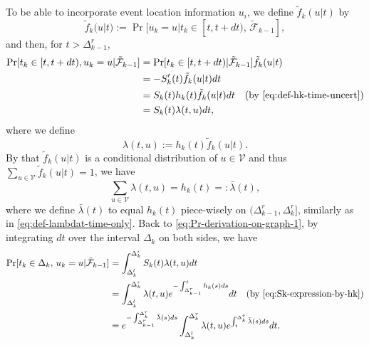 \documentclass[11pt]{article}
\theoremstyle{remark}
\theoremstyle{plain}
\newcommand{\calF}{\mathcal{F}}
\newcommand{\calV}{\mathcal{V}}
\begin{document}
%
To be able to incorporate event location information $u_i$, we define $\tilde{f}_k(u|t)$ by
\begin{equation}\label{eq:def-tilde-fk}
\tilde{f}_k(u|t)  
:= \Pr [ u_k = u| t_k \in [t, t+dt), \, \tilde{\calF}_{k-1} ],
\end{equation}
and then, for $t > \Delta_{k-1}^r$,
\begin{align}
\Pr[ t_k \in [t, t+dt), u_k =u | \tilde{\calF}_{k-1} ]
& = \Pr[ t_k \in [t, t+dt)  | \tilde{\calF}_{k-1} ]\tilde{f}_k(u|t)  \nonumber \\
& = -S_k'(t) \tilde{f}_k(u|t) dt  \nonumber  \\
& = S_k(t) h_k(t) \tilde{f}_k(u|t) dt 
    \quad \text{(by \eqref{eq:def-hk-time-uncert})}\nonumber  \\
& = S_k(t) \lambda( t, u) dt, \label{eq:Pr-derivation-on-graph-1}
\end{align}
where we define 
\begin{equation}\label{eq:def-lambda-tu}
\lambda(t,u) := h_k(t) \tilde{f}_k(u|t).
\end{equation}
By that $\tilde{f}_k(u|t)$ is a conditional distribution of $u \in \calV$ and thus
$\sum_{u \in\calV} \tilde{f}_k(u|t) = 1 $,  we have
\begin{equation}\label{eq:equation-bar-lambda(t)}
\sum_{u \in\calV} \lambda(t,u) = h_k(t) =: \bar{\lambda}(t),
\end{equation}
where we define $\bar{\lambda}(t)$ to equal $h_k(t)$ piece-wisely on $(\Delta_{k-1}^r, \Delta_{k}^r]$, similarly as in 
\eqref{eq:def-lambdat-time-only}.
Back to \eqref{eq:Pr-derivation-on-graph-1},
by integrating $dt$ over the interval $\Delta_k$ on both sides,
we have
\begin{align}
\Pr [ t_k \in \Delta_k, \, u_k = u | \tilde{\calF}_{k-1}]
& = \int_{\Delta_k^l}^{\Delta_k^r} S_k(t) \lambda( t, u) dt  \nonumber  \\
& = \int_{\Delta_k^l}^{\Delta_k^r} \lambda( t, u) e^{ - \int_{\Delta_{k-1}^r}^t h_k(s) ds} dt  \quad \text{(by \eqref{eq:Sk-expression-by-hk})}
 	 \label{eq:Pr-tk-cont-time-uncert-on-graph-form-a}\\
& = e^{ - \int_{\Delta_{k-1}^r}^{\Delta_{k}^r}  \bar{\lambda} (s) ds}  
	\int_{\Delta_k^l}^{\Delta_k^r} \lambda( t, u) e^{ \int_t^{\Delta_{k}^r}  \bar{\lambda} (s) ds} dt.
	\label{eq:Pr-tk-cont-time-uncert-on-graph}
\end{align}
\end{document}
